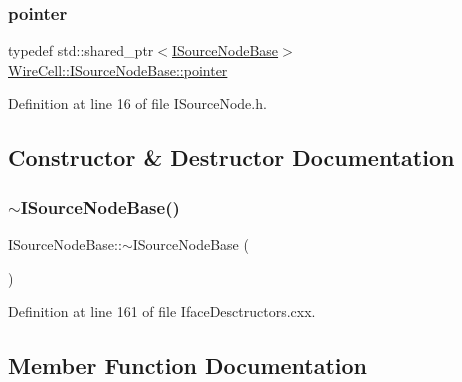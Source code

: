 \subsubsection{\texorpdfstring{pointer}{pointer}}
{\footnotesize\ttfamily typedef std\+::shared\+\_\+ptr$<$\hyperlink{class_wire_cell_1_1_i_source_node_base}{I\+Source\+Node\+Base}$>$ \hyperlink{class_wire_cell_1_1_i_source_node_base_a40248dae2503a1039343cd98f15e9519}{Wire\+Cell\+::\+I\+Source\+Node\+Base\+::pointer}}



Definition at line 16 of file I\+Source\+Node.\+h.



\subsection{Constructor \& Destructor Documentation}
\mbox{\label{class_wire_cell_1_1_i_source_node_base_a4e3908b689f6cb4b826bac0ecc3ad8a2}} 
\subsubsection{\texorpdfstring{$\sim$\+I\+Source\+Node\+Base()}{~ISourceNodeBase()}}
{\footnotesize\ttfamily I\+Source\+Node\+Base\+::$\sim$\+I\+Source\+Node\+Base (\begin{DoxyParamCaption}{ }\end{DoxyParamCaption})\hspace{0.3cm}{\ttfamily [virtual]}}



Definition at line 161 of file Iface\+Desctructors.\+cxx.



\subsection{Member Function Documentation}
\mbox{\label{class_wire_cell_1_1_i_source_node_base_adc531c3da5aa3192940e60390e683736}} 
